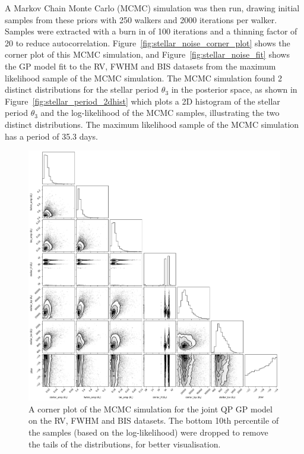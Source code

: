 A Markov Chain Monte Carlo (MCMC) simulation was then run, drawing initial samples from these priors with 250 walkers and
2000 iterations per walker.
Samples were extracted with a burn in of 100 iterations and a thinning factor of 20 to reduce autocorrelation.
Figure~\eqref{fig:stellar_noise_corner_plot} shows the corner plot of this MCMC simulation, and
Figure~\eqref{fig:stellar_noise_fit} shows the GP model fit to the RV, FWHM and BIS datasets from the maximum likelihood
sample of the MCMC simulation.
The MCMC simulation found 2 distinct distributions for the stellar period $\theta_{3}$ in the posterior space, as shown
in Figure~\eqref{fig:stellar_period_2dhist} which plots a 2D histogram of the stellar period $\theta_{3}$ and the log-likelihood
of the MCMC samples, illustrating the two distinct distributions.
The maximum likelihood sample of the MCMC simulation has a period of 35.3 days.

\begin{figure}[htb]
    \centering
    \includegraphics[width=1\textwidth]{figures/stellar_noise_corner_plot}
    \caption{A corner plot of the MCMC simulation for the joint QP GP model on the RV, FWHM and BIS datasets.
    The bottom 10th percentile of the samples (based on the log-likelihood) were dropped to remove the tails of the distributions,
    for better visualisation.}
    \label{fig:stellar_noise_corner_plot}
\end{figure}

